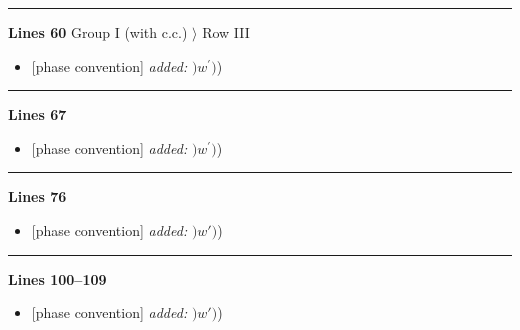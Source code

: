 \documentclass[10pt]{article}
\begin{document}
\par
{}\noindent\rule{\linewidth}{0.3pt}\par\noindent\textbf{Lines 60} \quad \textsf{Group I (with c.c.) $\rangle$ Row III} \par
\begin{itemize}[leftmargin=2.2em,itemsep=1pt,topsep=2pt]
\item[\textbf{l.60}] \textsf{\small [phase convention]} \emph{added:} $\displaystyle )$$\displaystyle w^\prime)${\color{gray}\small)}
\end{itemize}
\par
{}\noindent\rule{\linewidth}{0.3pt}\par\noindent\textbf{Lines 67} \par
\begin{itemize}[leftmargin=2.2em,itemsep=1pt,topsep=2pt]
\item[\textbf{l.67}] \textsf{\small [phase convention]} \emph{added:} $\displaystyle )$$\displaystyle w^\prime)${\color{gray}\small)}
\end{itemize}
\par
{}\noindent\rule{\linewidth}{0.3pt}\par\noindent\textbf{Lines 76} \par
\begin{itemize}[leftmargin=2.2em,itemsep=1pt,topsep=2pt]
\item[\textbf{l.76}] \textsf{\small [phase convention]} \emph{added:} $\displaystyle )$$\displaystyle w')${\color{gray}\small)}
\end{itemize}
\par
{}\noindent\rule{\linewidth}{0.3pt}\par\noindent\textbf{Lines 100--109} \par
\begin{itemize}[leftmargin=2.2em,itemsep=1pt,topsep=2pt]
\item[\textbf{l.100}] \textsf{\small [phase convention]} \emph{added:} $\displaystyle )$$\displaystyle w')${\color{gray}\small)}
\end{itemize}
\end{document}

